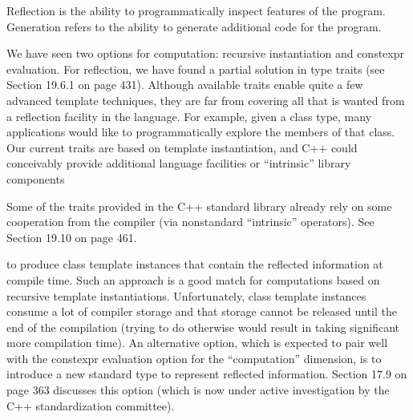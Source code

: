Reflection is the ability to programmatically inspect features of the program. Generation refers to the ability to generate additional code for the program.

We have seen two options for computation: recursive instantiation and constexpr evaluation. For reflection, we have found a partial solution in type traits (see Section 19.6.1 on page 431). Although available traits enable quite a few advanced template techniques, they are far from covering all that is wanted from a reflection facility in the language. For example, given a class type, many applications would like to programmatically explore the members of that class. Our current traits are based on template instantiation, and C++ could conceivably provide additional language facilities or “intrinsic” library components

\begin{tcolorbox}[colback=webgreen!5!white,colframe=webgreen!75!black]
\hspace*{0.75cm}Some of the traits provided in the C++ standard library already rely on some cooperation from the compiler (via nonstandard “intrinsic” operators). See Section 19.10 on page 461.
\end{tcolorbox}

to produce class template instances that contain the reflected information at compile time. Such an approach is a good match for computations based on recursive template instantiations. Unfortunately, class template instances consume a lot of compiler storage and that storage cannot be released until the end of the compilation (trying to do otherwise would result in taking significant more compilation time). An alternative option, which is expected to pair well with the constexpr evaluation option for the “computation” dimension, is to introduce a new standard type to represent reflected information. Section 17.9 on page 363 discusses this option (which is now under active investigation by the C++ standardization committee).

